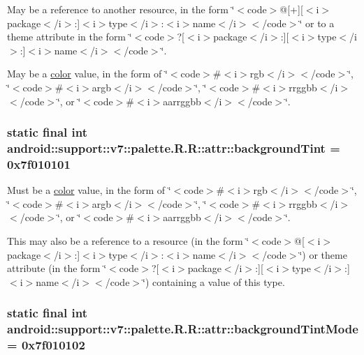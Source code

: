 May be a reference to another resource, in the form \char`\"{}$<$code$>$@\mbox{[}+\mbox{]}\mbox{[}$<$i$>$package$<$/i$>$:\mbox{]}$<$i$>$type$<$/i$>$:$<$i$>$name$<$/i$>$$<$/code$>$\char`\"{} or to a theme attribute in the form \char`\"{}$<$code$>$?\mbox{[}$<$i$>$package$<$/i$>$:\mbox{]}\mbox{[}$<$i$>$type$<$/i$>$:\mbox{]}$<$i$>$name$<$/i$>$$<$/code$>$\char`\"{}. 

May be a \hyperlink{classandroid_1_1support_1_1v7_1_1palette_1_1_r_1_1color}{color} value, in the form of \char`\"{}$<$code$>$\#$<$i$>$rgb$<$/i$>$$<$/code$>$\char`\"{}, \char`\"{}$<$code$>$\#$<$i$>$argb$<$/i$>$$<$/code$>$\char`\"{}, \char`\"{}$<$code$>$\#$<$i$>$rrggbb$<$/i$>$$<$/code$>$\char`\"{}, or \char`\"{}$<$code$>$\#$<$i$>$aarrggbb$<$/i$>$$<$/code$>$\char`\"{}. \hypertarget{classandroid_1_1support_1_1v7_1_1palette_1_1_r_1_1attr_d99a081ef3a6cdbe9689755cf511c171}{
\subsubsection[{backgroundTint}]{\setlength{\rightskip}{0pt plus 5cm}static final int android::support::v7::palette.R.R::attr::backgroundTint = 0x7f010101}}
\label{classandroid_1_1support_1_1v7_1_1palette_1_1_r_1_1attr_d99a081ef3a6cdbe9689755cf511c171}


Must be a \hyperlink{classandroid_1_1support_1_1v7_1_1palette_1_1_r_1_1color}{color} value, in the form of \char`\"{}$<$code$>$\#$<$i$>$rgb$<$/i$>$$<$/code$>$\char`\"{}, \char`\"{}$<$code$>$\#$<$i$>$argb$<$/i$>$$<$/code$>$\char`\"{}, \char`\"{}$<$code$>$\#$<$i$>$rrggbb$<$/i$>$$<$/code$>$\char`\"{}, or \char`\"{}$<$code$>$\#$<$i$>$aarrggbb$<$/i$>$$<$/code$>$\char`\"{}. 

This may also be a reference to a resource (in the form \char`\"{}$<$code$>$@\mbox{[}$<$i$>$package$<$/i$>$:\mbox{]}$<$i$>$type$<$/i$>$:$<$i$>$name$<$/i$>$$<$/code$>$\char`\"{}) or theme attribute (in the form \char`\"{}$<$code$>$?\mbox{[}$<$i$>$package$<$/i$>$:\mbox{]}\mbox{[}$<$i$>$type$<$/i$>$:\mbox{]}$<$i$>$name$<$/i$>$$<$/code$>$\char`\"{}) containing a value of this type. \hypertarget{classandroid_1_1support_1_1v7_1_1palette_1_1_r_1_1attr_8769b84559b2a0ed92f616d2f18753b1}{
\subsubsection[{backgroundTintMode}]{\setlength{\rightskip}{0pt plus 5cm}static final int android::support::v7::palette.R.R::attr::backgroundTintMode = 0x7f010102}}
\label{classandroid_1_1support_1_1v7_1_1palette_1_1_r_1_1attr_8769b84559b2a0ed92f616d2f18753b1}


